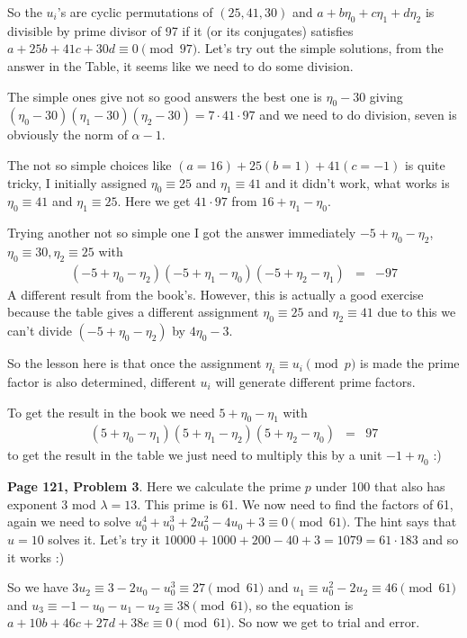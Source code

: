 \documentclass[aps,preprint,preprintnumbers,nofootinbib,showpacs,prd]{revtex4-1}
\newcommand{\nbea}{\begin{eqnarray*}}
\newcommand{\neea}{\end{eqnarray*}}
\begin{document}
So the $u_i$'s are cyclic permutations of $(25,41,30)$ and $a + b\eta_0 + c\eta_1 + d\eta_2$ is divisible by prime divisor of 97 if it (or its conjugates) satisfies $a + 25b + 41c + 30d \equiv 0 \pmod{97}$. Let's try out the simple solutions, from the answer in the Table, it seems like we need to do some division.

The simple ones give not so good answers the best one is $\eta_0 - 30$ giving $(\eta_0 - 30)(\eta_1 - 30)(\eta_2 - 30) = 7 \cdot 41 \cdot 97$ and we need to do division, seven is obviously the norm of $\alpha - 1$.

The not so simple choices like $(a=16) + 25(b=1) + 41(c=-1)$ is quite tricky, I initially assigned $\eta_0 \equiv 25$ and $\eta_1 \equiv 41$ and it didn't work, what works is $\eta_0 \equiv 41$ and $\eta_1 \equiv 25$. Here we get $41 \cdot 97$ from $16 + \eta_1 - \eta_0$.

Trying another not so simple one I got the answer immediately $-5 + \eta_0 - \eta_2$, $\eta_0 \equiv 30, \eta_2 \equiv 25$ with 
%
\nbea
(-5 + \eta_0 - \eta_2)(-5 + \eta_1 - \eta_0)(-5 + \eta_2 - \eta_1) & = & -97
\neea
%
A different result from the book's. However, this is actually a good exercise because the table gives a different assignment $\eta_0 \equiv 25$ and $\eta_2 \equiv 41$ due to this we can't divide $(-5 + \eta_0 - \eta_2)$ by $4\eta_0 - 3$.

So the lesson here is that once the assignment $\eta_i \equiv u_i \pmod{p}$ is made the prime factor is also determined, different $u_i$ will generate different prime factors.

To get the result in the book we need $5 + \eta_0 - \eta_1$ with
%
\nbea
(5 + \eta_0 - \eta_1)(5 + \eta_1 - \eta_2)(5 + \eta_2 - \eta_0) & = & 97
\neea
%
to get the result in the table we just need to multiply this by a unit $-1 + \eta_0$ :)

{\bf Page 121, Problem 3}. Here we calculate the prime $p$ under 100 that also has exponent 3 mod $\lambda = 13$. This prime is 61. We now need to find the factors of 61, again we need to solve $u_0^4 + u_0^3 + 2u_0^2 - 4u_0 + 3 \equiv 0 \pmod{61}$. The hint says that $u = 10$ solves it. Let's try it $10000 + 1000 + 200 - 40 + 3 = 1079 = 61 \cdot 183$ and so it works :)

So we have $3u_2 \equiv 3 - 2u_0 - u_0^3 \equiv 27 \pmod{61}$ and $u_1 \equiv u_0^2 - 2u_2 \equiv 46 \pmod{61}$ and $u_3 \equiv -1 - u_0 - u_1 - u_2 \equiv 38 \pmod{61}$, so the equation is $a + 10b + 46c + 27d +38e \equiv 0 \pmod{61}$. So now we get to trial and error.
\end{document}
